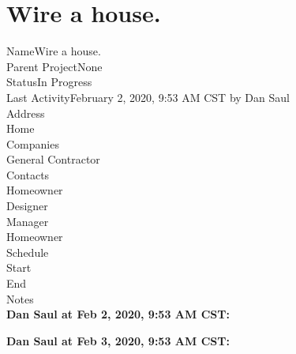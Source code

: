 \documentclass{article}
\newcommand\mydotfill{\cftdotfill{\cftdotsep}}
\newcommand{\subhead}[1]{{\Large #1 \vspace{1ex}}}
\begin{document}
	\section*{Wire a house.}
		
		Name\enspace\mydotfill\enspace Wire a house. \\
		Parent Project\enspace\mydotfill\enspace None \\
		Status\enspace\mydotfill\enspace In Progress \\
		Last Activity\enspace\mydotfill\enspace February 2, 2020, 9:53 AM CST by Dan Saul \\
		
		\subhead{Address}\\
		Home\enspace\mydotfill\enspace{} \\
		
		\subhead{Companies}\\
		General Contractor\enspace\mydotfill\enspace{} \\
		
		\subhead{Contacts} \\
		Homeowner\enspace\mydotfill\enspace{}\\
		Designer\enspace\mydotfill\enspace{}\\
		Manager\enspace\mydotfill\enspace{}\\
		Homeowner\enspace\mydotfill\enspace{} \\
		
		\subhead{Schedule} \\
		Start\enspace\mydotfill\enspace{}\\
		End\enspace\mydotfill\enspace{} \\
		
		\subhead{Notes} \\
		\textbf{Dan Saul at Feb 2, 2020, 9:53 AM CST:}\\
		\normalsize	\blindtext
		
		\textbf{Dan Saul at Feb 3, 2020, 9:53 AM CST:}\\
		\normalsize	\blindtext
		
\end{document}

